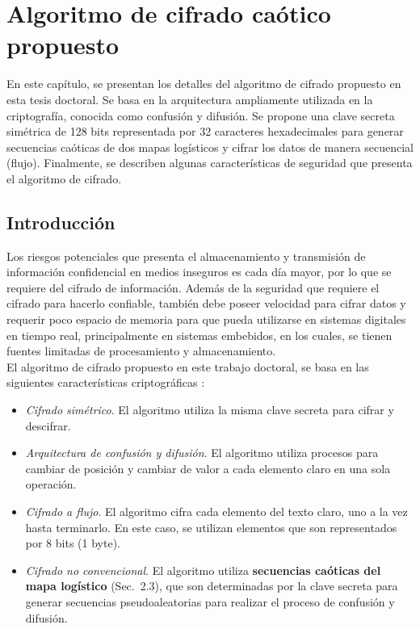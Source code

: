 
\chapter{Algoritmo de cifrado caótico propuesto}
En este capítulo, se presentan los detalles del algoritmo de cifrado propuesto en esta tesis doctoral. Se basa en la arquitectura ampliamente utilizada en la criptografía, conocida como confusión y difusión. Se propone una clave secreta simétrica de 128 bits representada por 32 caracteres hexadecimales para generar secuencias caóticas de dos mapas logísticos y cifrar los datos de manera secuencial (flujo). Finalmente, se describen algunas características de seguridad que presenta el algoritmo de cifrado. 

\section{Introducción}
Los riesgos potenciales que presenta el almacenamiento y transmisión de información confidencial en medios inseguros es cada día mayor, por lo que se requiere del cifrado de información. Además de la seguridad que requiere el cifrado para hacerlo confiable, también debe poseer velocidad para cifrar datos y requerir poco espacio de memoria para que pueda utilizarse en sistemas digitales en tiempo real, principalmente en sistemas embebidos, en los cuales, se tienen fuentes limitadas de procesamiento y almacenamiento. \\

El algoritmo de cifrado propuesto en este trabajo doctoral, se basa en las siguientes características criptográficas \cite{KyS_1997}:
\begin{itemize}
\item \textit{Cifrado simétrico}. El algoritmo utiliza la misma clave secreta para cifrar y descifrar.
\item \textit{Arquitectura de confusión y difusión}. El algoritmo utiliza procesos para cambiar de posición y cambiar de valor a cada elemento claro en una sola operación.
\item \textit{Cifrado a flujo}. El algoritmo cifra cada elemento del texto claro, uno a la vez hasta terminarlo. En este caso, se utilizan elementos que son representados por 8 bits (1 byte).
\item \textit{Cifrado no convencional}. El algoritmo utiliza \textbf{secuencias caóticas del mapa logístico} (Sec.~2.3), que son determinadas por la clave secreta para generar secuencias pseudoaleatorias para realizar el proceso de confusión y difusión.  \\ 
\end{itemize}

